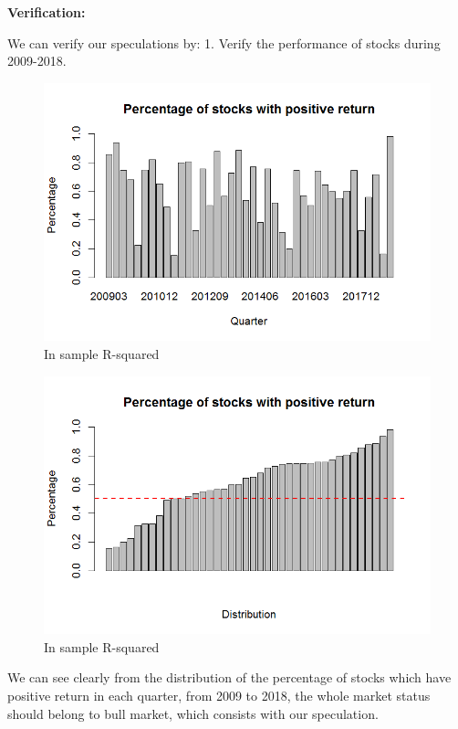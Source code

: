 \documentclass[]{article}
\begin{document}
\textbf{Verification:}

We can verify our speculations by: 1. Verify the performance of stocks
during 2009-2018.

\begin{figure}[H]
\begin{center}
\includegraphics[width=5in]{Lab//Pos_stock_ptg.jpg}
\caption{In sample R-squared}
\label{figure14}
\end{center}
\end{figure}

\begin{figure}[H]
\begin{center}
\includegraphics[width=5in]{Lab//Pos_stock_ptg_dist.jpg}
\caption{In sample R-squared}
\label{figure15}
\end{center}
\end{figure}

We can see clearly from the distribution of the percentage of stocks
which have positive return in each quarter, from 2009 to 2018, the whole
market status should belong to bull market, which consists with our
speculation.
\end{document}
